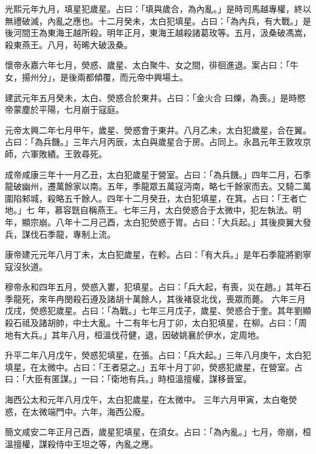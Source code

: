 \begin{pinyinscope}
 光熙元年九月，填星犯歲星。占曰：「填與歲合，為內亂。」是時司馬越專權，終以無禮破滅，內亂之應也。十二月癸未，太白犯填星。占曰：「為內兵，有大戰。」是後河間王為東海王越所殺。明年正月，東海王越殺諸葛玫等。五月，汲桑破馮嵩，殺東燕王。八月，茍晞大破汲桑。



 懷帝永嘉六年七月，熒惑、歲星、太白聚牛、女之間，徘徊進退。案占曰：「牛女，揚州分」，是後兩都傾覆，而元帝中興場土。



 建武元年五月癸未，太白、熒惑合於東井。占曰：「金火合
 曰爍，為喪。」是時愍帝蒙塵於平陽，七月崩于寇庭。



 元帝太興二年七月甲午，歲星、熒惑會于東井。八月乙未，太白犯歲星，合在翼。占曰：「為兵饑。」三年六月丙辰，太白與歲星合于房。占同上。永昌元年王敦攻京師，六軍敗績。王敦尋死。



 成帝咸康三年十一月乙丑，太白犯歲星于營室。占曰：「為兵饑。」四年二月，石季龍破幽州，遷萬餘家以南。五年，季龍眾五萬寇沔南，略七千餘家而去。又騎二萬圍陷邾城，殺略五千餘人。四年十二月癸丑，太白犯填星，在箕。占曰：「王者亡地。」七
 年，慕容皝自稱燕王。七年三月，太白熒惑合于太微中，犯左執法。明年，顯宗崩。八年十二月己酉，太白犯熒惑于胃。占曰：「大兵起。」其後庾翼大發兵，謀伐石季龍，專制上流。



 康帝建元元年八月丁未，太白犯歲星，在軫。占曰：「有大兵。」是年石季龍將劉寧寇沒狄道。



 穆帝永和四年五月，熒惑入婁，犯填星。占曰：「兵大起，有喪，災在趙。」其年石季龍死，來年冉閔殺石遵及諸胡十萬餘人，其後褚裒北伐，喪眾而薨。
 六年三月戊戌，熒惑犯歲星。占曰：「為戰。」七年三月戊子，歲星、熒惑合于奎。其年劉顯殺石祗及諸胡帥，中士大亂。十二有年七月丁卯，太白犯填星，在柳。占曰：「周地有大兵。」其年八月，桓溫伐苻健，退，因破姚襄於伊水，定周地。



 升平二年八月戊午，熒惑犯填星，在張。占曰：「兵大起。」三年八月庚午，太白犯填星，在太微中。占曰：「王者惡之。」五年十月丁卯，熒惑犯歲星，在營室。占曰：「大臣有匿謀。」一曰：「衛地有兵。」時桓溫擅權，謀移晉室。



 海西公太和元年八月戊午，太白犯歲星，在太微中。
 三年六月甲寅，太白奄熒惑，在太微端門中。六年，海西公廢。



 簡文咸安二年正月己酉，歲星犯填星，在須女。占曰：「為內亂。」七月，帝崩，桓溫擅權，謀殺侍中王坦之等，內亂之應。




\end{pinyinscope}

